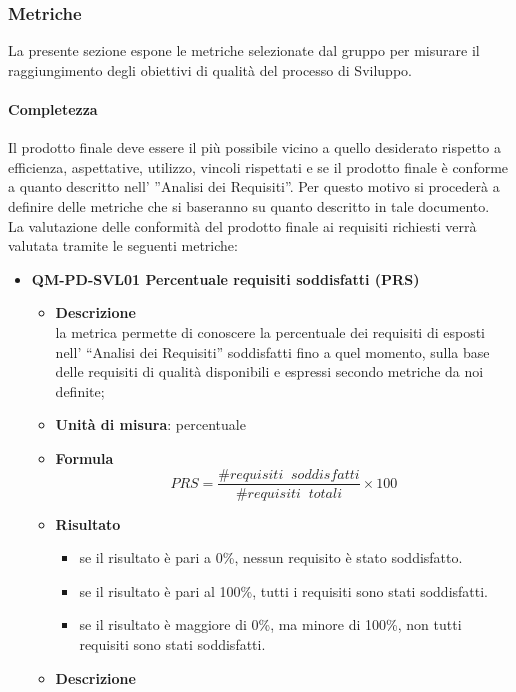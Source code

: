 		\subsubsection{Metriche}
			La presente sezione espone le metriche selezionate dal gruppo per misurare il raggiungimento degli obiettivi di qualità del processo di Sviluppo. \\
			\paragraph{Completezza}
				Il prodotto finale deve essere il più possibile vicino a quello desiderato rispetto a efficienza, aspettative, utilizzo, vincoli rispettati e se il prodotto finale è conforme a quanto descritto nell’ ”Analisi dei Requisiti”. Per questo motivo si procederà a definire delle metriche che si baseranno su quanto descritto in tale documento.\\
				La valutazione delle conformità del prodotto finale ai requisiti richiesti verrà valutata tramite le seguenti metriche:\\
				\begin{itemize}
					\item\textbf{QM-PD-SVL01 Percentuale requisiti soddisfatti (PRS)}
						\begin{itemize}
							\item\textbf{Descrizione}\\
								la metrica permette di conoscere la percentuale dei requisiti di esposti nell’ “Analisi dei Requisiti” soddisfatti fino a quel momento, sulla base delle requisiti di qualità disponibili e espressi secondo metriche da noi definite;\\
							\item\textbf{Unità di misura}: percentuale
							\item\textbf{Formula}\\
								\[PRS = \frac{\mathit{\#requisiti\;\;soddisfatti}}{\mathit{\#requisiti\;\;totali}} \times 100 \]
							\item\textbf{Risultato}\\
								\begin{itemize}
									\item se il risultato è pari a 0\%, nessun requisito è stato soddisfatto.
									\item se il risultato è pari al 100\%, tutti i requisiti sono stati soddisfatti.
									\item se il risultato è maggiore di 0\%, ma minore di 100\%, non tutti requisiti sono stati soddisfatti.
								\end{itemize}
							\item\textbf{Descrizione}\\
						\end{itemize}
				\end{itemize}
\iffalse
